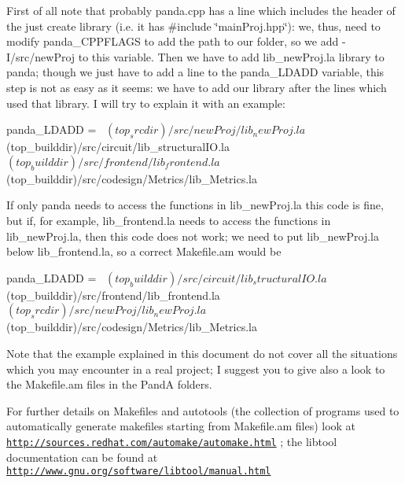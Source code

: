 First of all note that probably panda.\+cpp has a line which includes the header of the just create library (i.\+e. it has \#include \char`\"{}main\+Proj.\+hpp\char`\"{})\+: we, thus, need to modify panda\+\_\+\+C\+P\+P\+F\+L\+A\+GS to add the path to our folder, so we add -\/I/src/new\+Proj to this variable. Then we have to add lib\+\_\+new\+Proj.\+la library to panda; though we just have to add a line to the panda\+\_\+\+L\+D\+A\+DD variable, this step is not as easy as it seems\+: we have to add our library after the lines which used that library. I will try to explain it with an example\+: \begin{DoxyVerb}panda_LDADD = \
                        $(top_srcdir)/src/newProj/lib_newProj.la \
                        $(top_builddir)/src/circuit/lib_structuralIO.la \
                        $(top_builddir)/src/frontend/lib_frontend.la \
                        $(top_builddir)/src/codesign/Metrics/lib_Metrics.la
\end{DoxyVerb}
 If only panda needs to access the functions in lib\+\_\+new\+Proj.\+la this code is fine, but if, for example, lib\+\_\+frontend.\+la needs to access the functions in lib\+\_\+new\+Proj.\+la, then this code does not work; we need to put lib\+\_\+new\+Proj.\+la below lib\+\_\+frontend.\+la, so a correct Makefile.\+am would be \begin{DoxyVerb}panda_LDADD = \
                        $(top_builddir)/src/circuit/lib_structuralIO.la \
                        $(top_builddir)/src/frontend/lib_frontend.la \
                        $(top_srcdir)/src/newProj/lib_newProj.la \
                        $(top_builddir)/src/codesign/Metrics/lib_Metrics.la
\end{DoxyVerb}


Note that the example explained in this document do not cover all the situations which you may encounter in a real project; I suggest you to give also a look to the Makefile.\+am files in the PandA folders.

For further details on Makefiles and autotools (the collection of programs used to automatically generate makefiles starting from Makefile.\+am files) look at \href{http://sources.redhat.com/automake/automake.html}{\tt http\+://sources.\+redhat.\+com/automake/automake.\+html} ; the libtool documentation can be found at \href{http://www.gnu.org/software/libtool/manual.html}{\tt http\+://www.\+gnu.\+org/software/libtool/manual.\+html} 